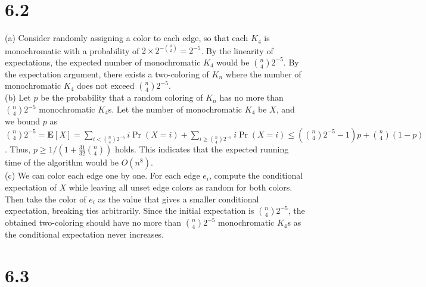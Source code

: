 \documentclass{article}
\begin{document}
\section*{6.2}
(a) Consider randomly assigning a color to each edge, so that each $K_4$ is monochromatic with a probability of $2\times2^{-\binom{4}{2}}=2^{-5}$.
By the linearity of expectations, the expected number of monochromatic $K_4$ would be $\binom{n}{4}2^{-5}$.
By the expectation argument, there exists a two-coloring of $K_n$ where the number of monochromatic $K_4$ does not exceed $\binom{n}{4}2^{-5}$.\\
(b) Let $p$ be the probability that a random coloring of $K_n$ has no more than $\binom{n}{4}2^{-5}$ monochromatic $K_4$s.
Let the number of monochromatic $K_4$ be $X$, and we bound $p$ as $\binom{n}{4}2^{-5}=\textbf{E}[X]=\sum\limits_{i<\binom{n}{4}2^{-5}}i\Pr(X=i)+\sum\limits_{i\geq\binom{n}{4}2^{-5}}i\Pr(X=i)\leq \left(\binom{n}{4}2^{-5}-1\right)p+\binom{n}{4}(1-p)$.
Thus, $p \geq 1/(1+\frac{31}{32}\binom{n}{4})$ holds.
This indicates that the expected running time of the algorithm would be $O(n^8)$.\\
(c) We can color each edge one by one.
For each edge $e_i$, compute the conditional expectation of $X$ while leaving all unset edge colors as random for both colors.
Then take the color of $e_i$ as the value that gives a smaller conditional expectation, breaking ties arbitrarily.
Since the initial expectation is $\binom{n}{4}2^{-5}$, the obtained two-coloring should have no more than $\binom{n}{4}2^{-5}$ monochromatic $K_4$s as the conditional expectation never increases.
\section*{6.3}
\end{document}
